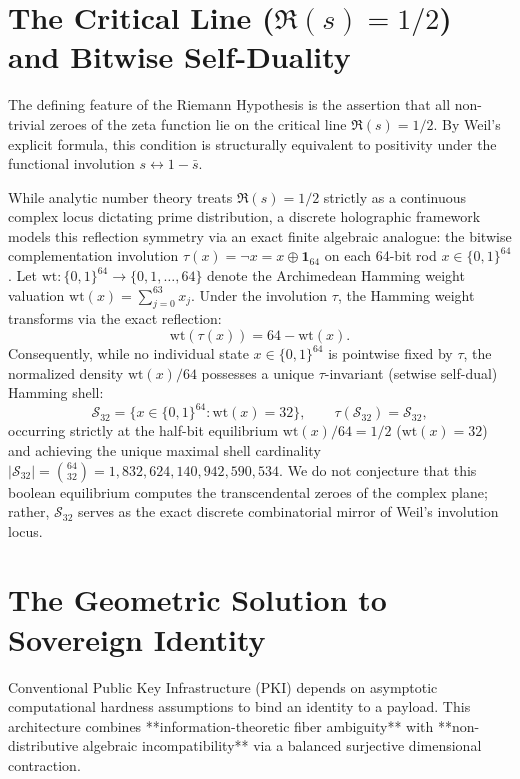\documentclass[11pt, a4paper]{article}
\begin{document}
\section{The Critical Line (\texorpdfstring{$\Re(s) = 1/2$}{Re(s) = 1/2}) and Bitwise Self-Duality}

The defining feature of the Riemann Hypothesis is the assertion that all non-trivial zeroes of the zeta function lie on the critical line $\Re(s) = 1/2$. By Weil's explicit formula, this condition is structurally equivalent to positivity under the functional involution $s \leftrightarrow 1 - \bar{s}$.

While analytic number theory treats $\Re(s) = 1/2$ strictly as a continuous complex locus dictating prime distribution, a discrete holographic framework models this reflection symmetry via an exact finite algebraic analogue: the bitwise complementation involution $\tau(x) = \lnot x = x \oplus \mathbf{1}_{64}$ on each 64-bit rod $x \in \{0,1\}^{64}$. Let $\mathrm{wt} : \{0,1\}^{64} \to \{0, 1, \dots, 64\}$ denote the Archimedean Hamming weight valuation $\mathrm{wt}(x) = \sum_{j=0}^{63} x_j$. Under the involution $\tau$, the Hamming weight transforms via the exact reflection:
\[
\mathrm{wt}(\tau(x)) = 64 - \mathrm{wt}(x).
\]
Consequently, while no individual state $x \in \{0,1\}^{64}$ is pointwise fixed by $\tau$, the normalized density $\mathrm{wt}(x) / 64$ possesses a unique $\tau$-invariant (setwise self-dual) Hamming shell:
\[
\mathcal{S}_{32} = \bigl\{x \in \{0,1\}^{64} : \mathrm{wt}(x) = 32\bigr\}, \qquad \tau(\mathcal{S}_{32}) = \mathcal{S}_{32},
\]
occurring strictly at the half-bit equilibrium $\mathrm{wt}(x) / 64 = 1/2$ ($\mathrm{wt}(x) = 32$) and achieving the unique maximal shell cardinality $|\mathcal{S}_{32}| = \binom{64}{32} = 1{,}832{,}624{,}140{,}942{,}590{,}534$. We do not conjecture that this boolean equilibrium computes the transcendental zeroes of the complex plane; rather, $\mathcal{S}_{32}$ serves as the exact discrete combinatorial mirror of Weil's involution locus.

\section{The Geometric Solution to Sovereign Identity}

Conventional Public Key Infrastructure (PKI) depends on asymptotic computational hardness assumptions to bind an identity to a payload. This architecture combines **information-theoretic fiber ambiguity** with **non-distributive algebraic incompatibility** via a balanced surjective dimensional contraction.
\end{document}
